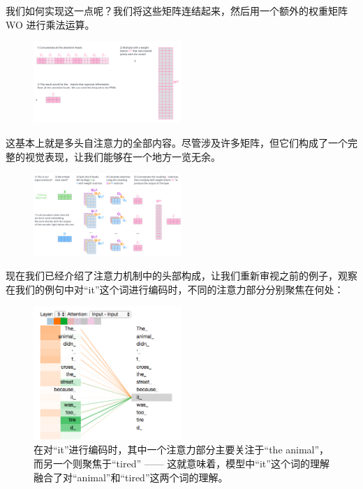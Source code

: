 \documentclass[cn,hazy,blue,10pt,normal]{elegantnote}
\begin{document}
我们如何实现这一点呢？我们将这些矩阵连结起来，然后用一个额外的权重矩阵 WO 进行乘法运算。

\begin{figure}[ht]
	\centering
	\includegraphics[width=0.5\textwidth]{image/transformer_attention_heads_weight_matrix_o.png}
\end{figure}

这基本上就是多头自注意力的全部内容。尽管涉及许多矩阵，但它们构成了一个完整的视觉表现，让我们能够在一个地方一览无余。

\begin{figure}[ht]
	\centering
	\includegraphics[width=0.5\textwidth]{image/transformer_multi-headed_self-attention-recap.png}
\end{figure}

现在我们已经介绍了注意力机制中的头部构成，让我们重新审视之前的例子，观察在我们的例句中对“it”这个词进行编码时，不同的注意力部分分别聚焦在何处：
\begin{figure}[ht]
	\centering
	\includegraphics[width=0.5\textwidth]{image/transformer_self-attention_visualization_2.png}
	\caption{在对“it”进行编码时，其中一个注意力部分主要关注于“the animal”，而另一个则聚焦于“tired” —— 这就意味着，模型中“it”这个词的理解融合了对“animal”和“tired”这两个词的理解。}
\end{figure}
\end{document}

